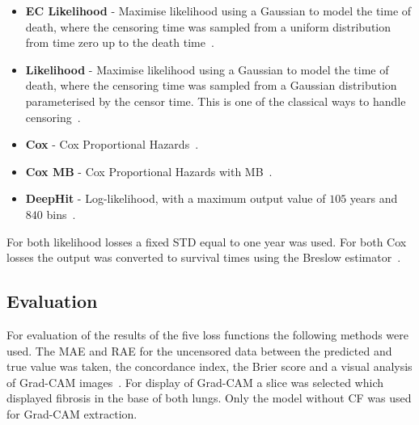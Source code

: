             \begin{itemize}
                \item \textbf{\gls{EC} Likelihood} - Maximise likelihood using a Gaussian to model the time of death, where the censoring time was sampled from a uniform distribution from time zero up to the death time~\parencite{Shahin2023DeepAnalysis}.
    
                \item \textbf{Likelihood} - Maximise likelihood using a Gaussian to model the time of death, where the censoring time was sampled from a Gaussian distribution parameterised by the censor time. This is one of the classical ways to handle censoring~\parencite{Lee2018DeepHit:Risks}.
    
                \item \textbf{Cox} - Cox Proportional Hazards~\parencite{Cox1972RegressionLife-Tables}.
    
                \item \textbf{Cox \gls{MB}} - Cox Proportional Hazards with \gls{MB}~\parencite{Shahin2022SurvivalData}.
    
                \item \textbf{DeepHit} - Log-likelihood, with a maximum output value of $105$ years and $840$ bins~\parencite{Lee2018DeepHit:Risks}.
            \end{itemize}
    
            For both likelihood losses a fixed \gls{STD} equal to one year was used. For both Cox losses the output was converted to survival times using the Breslow estimator~\parencite{Breslow1974CovarianceData}.

        \subsection{Evaluation} \label{sec:deep_learning_for_ct_based_survival_analysis_of_idiopathic_pulmonary_fibrosis_patients_appendix_methods_evaluation}
            For evaluation of the results of the five loss functions the following methods were used. The \gls{MAE} and \gls{RAE} for the uncensored data between the predicted and true value was taken, the concordance index, the Brier score and a visual analysis of \gls{Grad-CAM} images~\parencite{Raykar2008OnIndex, Gerds2006ConsistentTimes, Selvaraju2020Grad-CAM:Localization}. For display of \gls{Grad-CAM} a slice was selected which displayed fibrosis in the base of both lungs. Only the model without \gls{CF} was used for \gls{Grad-CAM} extraction.
    
